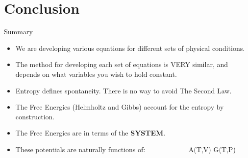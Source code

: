 \documentclass[t,10pt,mathserif,xcolor=pst,pdftex]{beamer}
\begin{document}
\section{Conclusion}

\begin{frame}{Summary}
\begin{itemize}
\item We are developing various equations for different sets of physical conditions.
\item The method for developing each set of equations is VERY similar, and depends on what variables you wish to hold constant. 
\item Entropy defines spontaneity. There is no way to avoid The Second Law.
\item The Free Energies (Helmholtz and Gibbs) account for the entropy by construction. 
\item The Free Energies are in terms of the \textbf{SYSTEM}.
\item These potentials are naturally functions of: $\quad$ $\qquad$ $\qquad$ A(T,V) G(T,P)
\end{itemize}
\end{frame}
\end{document}
